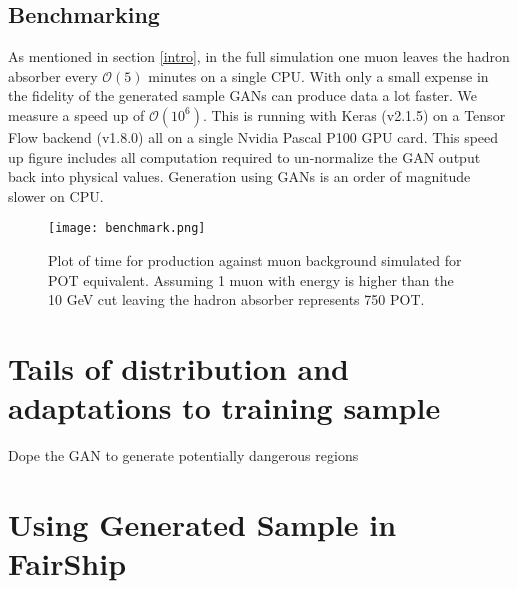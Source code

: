 \documentclass{article}
\begin{document}
        
            
    
        
        \subsection{Benchmarking}
        
            As mentioned in section \ref{intro}, in the full simulation one muon leaves the hadron absorber every $\mathcal{O}(5)$ minutes on a single CPU. With only a small expense in the fidelity of the generated sample GANs can produce data a lot faster. We measure a speed up of $\mathcal{O}(10^6)$. This is running with Keras (v2.1.5) on a Tensor Flow backend (v1.8.0) all on a single Nvidia Pascal P100 GPU card. This speed up figure includes all computation required to un-normalize the GAN output back into physical values. Generation using GANs is an order of magnitude slower on CPU. 
            
            \begin{figure}[h!]
            \centering
            \texttt{[image: benchmark.png]}
            \caption{Plot of time for production against muon background simulated for POT equivalent. Assuming 1 muon with energy is higher than the 10 GeV cut leaving the hadron absorber represents 750 POT.}
            \label{benchmark}
            \end{figure}
            
\section{Tails of distribution and adaptations to training sample}

    Dope the GAN to generate potentially dangerous regions
    


\section{Using Generated Sample in FairShip}
    
\end{document}
